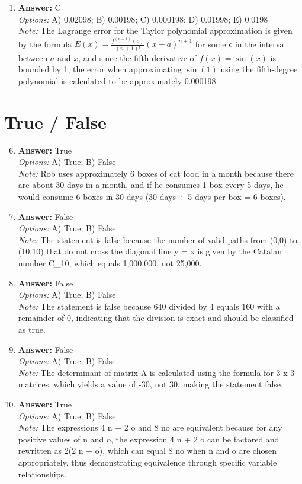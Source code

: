 \documentclass[12pt]{article}
\begin{document}
\begin{enumerate}[label=\arabic*.]
\item \textbf{Answer:} C
\\ \textit{Options:} A) 0.02098; B) 0.00198; C) 0.000198; D) 0.01998; E) 0.0198
\\ \textit{Note:} The Lagrange error for the Taylor polynomial approximation is given by the formula \( E(x) = \frac{f^{(n+1)}(c)}{(n+1)!} (x - a)^{n+1} \) for some \( c \) in the interval between \( a \) and \( x \), and since the fifth derivative of \( f(x) = \sin(x) \) is bounded by 1, the error when approximating \( \sin(1) \) using the fifth-degree polynomial is calculated to be approximately 0.000198.
\end{enumerate}

\section*{True / False}
\begin{enumerate}[label=\arabic*.]
\setcounter{enumi}{5}
\item \textbf{Answer:} True
\\ \textit{Options:} A) True; B) False
\\ \textit{Note:} Rob uses approximately 6 boxes of cat food in a month because there are about 30 days in a month, and if he consumes 1 box every 5 days, he would consume 6 boxes in 30 days (30 days ÷ 5 days per box = 6 boxes).
\item \textbf{Answer:} False
\\ \textit{Options:} A) True; B) False
\\ \textit{Note:} The statement is false because the number of valid paths from (0,0) to (10,10) that do not cross the diagonal line y = x is given by the Catalan number C\_10, which equals 1,000,000, not 25,000.
\item \textbf{Answer:} False
\\ \textit{Options:} A) True; B) False
\\ \textit{Note:} The statement is false because 640 divided by 4 equals 160 with a remainder of 0, indicating that the division is exact and should be classified as true.
\item \textbf{Answer:} False
\\ \textit{Options:} A) True; B) False
\\ \textit{Note:} The determinant of matrix A is calculated using the formula for 3 x 3 matrices, which yields a value of -30, not 30, making the statement false.
\item \textbf{Answer:} True
\\ \textit{Options:} A) True; B) False
\\ \textit{Note:} The expressions 4 n + 2 o and 8 no are equivalent because for any positive values of n and o, the expression 4 n + 2 o can be factored and rewritten as 2(2 n + o), which can equal 8 no when n and o are chosen appropriately, thus demonstrating equivalence through specific variable relationships.
\end{enumerate}
\end{document}

